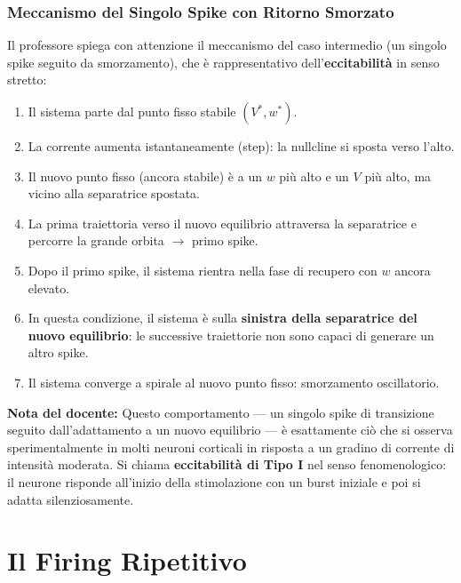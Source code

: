 \subsubsection{Meccanismo del Singolo Spike con Ritorno Smorzato}

Il professore spiega con attenzione il meccanismo del caso intermedio (un singolo spike seguito da smorzamento), che è rappresentativo dell'\textbf{eccitabilità} in senso stretto:

\begin{enumerate}
    \item Il sistema parte dal punto fisso stabile $(V^*, w^*)$.
    \item La corrente aumenta istantaneamente (step): la nullcline si sposta verso l'alto.
    \item Il nuovo punto fisso (ancora stabile) è a un $w$ più alto e un $V$ più alto, ma vicino alla separatrice spostata.
    \item La prima traiettoria verso il nuovo equilibrio attraversa la separatrice e percorre la grande orbita $\rightarrow$ primo spike.
    \item Dopo il primo spike, il sistema rientra nella fase di recupero con $w$ ancora elevato.
    \item In questa condizione, il sistema è sulla \textbf{sinistra della separatrice del nuovo equilibrio}: le successive traiettorie non sono capaci di generare un altro spike.
    \item Il sistema converge a spirale al nuovo punto fisso: smorzamento oscillatorio.
\end{enumerate}

\begin{tcolorbox}[colback=gray!5, colframe=gray!40, arc=2mm, boxrule=0.5pt]
\textbf{Nota del docente:} Questo comportamento — un singolo spike di transizione seguito dall'adattamento a un nuovo equilibrio — è esattamente ciò che si osserva sperimentalmente in molti neuroni corticali in risposta a un gradino di corrente di intensità moderata. Si chiama \textbf{eccitabilità di Tipo I} nel senso fenomenologico: il neurone risponde all'inizio della stimolazione con un burst iniziale e poi si adatta silenziosamente.
\end{tcolorbox}



\section{Il Firing Ripetitivo}

